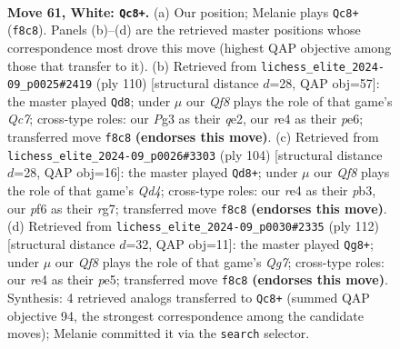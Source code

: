 \documentclass[11pt]{article}
\begin{document}
\clearpage

\begin{figure}[p]\centering
\begin{subfigure}{0.46\textwidth}\centering
\resizebox{\linewidth}{!}{%
\newchessgame
\chessboard[
  setfen={5Q2/8/5p2/3p1k2/4r3/6PK/q6P/8 w - - 2 61},
  showmover=false,
  pgfstyle=straightmove, color=movearrow, markmove={f8-c8}
]}
\caption{}
\end{subfigure}\hfill
\begin{subfigure}{0.46\textwidth}\centering
\resizebox{\linewidth}{!}{%
\newchessgame
\chessboard[
  setfen={8/2Q2pk1/4p3/8/1K6/1PP5/4q3/1q6 w - - 6 56},
  showmover=false,
  pgfstyle=straightmove, color=movearrow, markmove={c7-d8}
]}
\caption{}
\end{subfigure}
\\[4pt]
\begin{subfigure}{0.46\textwidth}\centering
\resizebox{\linewidth}{!}{%
\newchessgame
\chessboard[
  setfen={7k/6rp/8/8/3Q4/1p5P/4q1P1/7K w - - 10 53},
  showmover=false,
  pgfstyle=straightmove, color=movearrow, markmove={d4-d8}
]}
\caption{}
\end{subfigure}\hfill
\begin{subfigure}{0.46\textwidth}\centering
\resizebox{\linewidth}{!}{%
\newchessgame
\chessboard[
  setfen={8/6Q1/2q1kp2/4p3/8/4P3/5P2/6K1 w - - 12 57},
  showmover=false,
  pgfstyle=straightmove, color=movearrow, markmove={g7-g8}
]}
\caption{}
\end{subfigure}
\caption{\textbf{Move 61, White: \texttt{Qc8+}.} (a) Our position; Melanie plays \texttt{Qc8+} (\texttt{f8c8}). Panels (b)--(d) are the retrieved master positions whose correspondence most drove this move (highest QAP objective among those that transfer to it). (b) Retrieved from \texttt{lichess\_elite\_2024-09\_p0025\#2419} (ply 110) [structural distance $d$=28, QAP obj=57]: the master played \texttt{Qd8}; under $\mu$ our \emph{Qf8} plays the role of that game's \emph{Qc7}; cross-type roles: our \emph{P}g3 as their \emph{q}e2, our \emph{r}e4 as their \emph{p}e6; transferred move \texttt{f8c8} \textbf{(endorses this move)}. (c) Retrieved from \texttt{lichess\_elite\_2024-09\_p0026\#3303} (ply 104) [structural distance $d$=28, QAP obj=16]: the master played \texttt{Qd8+}; under $\mu$ our \emph{Qf8} plays the role of that game's \emph{Qd4}; cross-type roles: our \emph{r}e4 as their \emph{p}b3, our \emph{p}f6 as their \emph{r}g7; transferred move \texttt{f8c8} \textbf{(endorses this move)}. (d) Retrieved from \texttt{lichess\_elite\_2024-09\_p0030\#2335} (ply 112) [structural distance $d$=32, QAP obj=11]: the master played \texttt{Qg8+}; under $\mu$ our \emph{Qf8} plays the role of that game's \emph{Qg7}; cross-type roles: our \emph{r}e4 as their \emph{p}e5; transferred move \texttt{f8c8} \textbf{(endorses this move)}. Synthesis: 4 retrieved analogs transferred to \texttt{Qc8+} (summed QAP objective 94, the strongest correspondence among the candidate moves); Melanie committed it via the \texttt{search} selector.}
\label{fig:thought-m120}
\end{figure}
\end{document}
